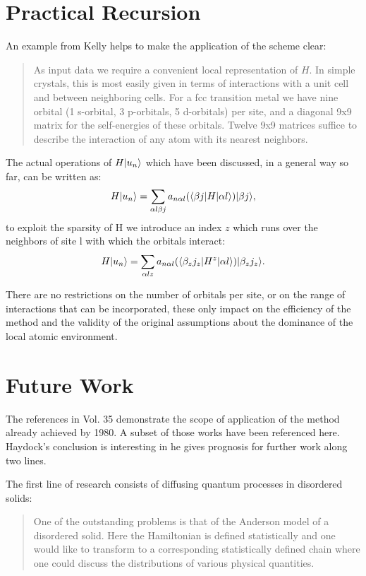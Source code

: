 \section{Practical Recursion}
An example from Kelly helps to make the application of the scheme clear:
%
\begin{quote}
As input data we require a convenient local representation of $H$. In simple crystals,
this is most easily given in terms of interactions with a unit cell and between neighboring cells.
For a fcc transition metal we have nine orbital (1 s-orbital, 3 p-orbitals, 5 d-orbitals) per site, and a diagonal 9x9 matrix
for the self-energies of these orbitals. Twelve 9x9 matrices suffice to describe the interaction 
of any atom with its nearest neighbors.
\end{quote}
%

The actual operations of $H|u_{n}\rangle$ which have been discussed, in a general way so far, 
can be written as:
%
\begin{equation}
H|u_{n}\rangle = \sum_{\alpha l \beta j}a_{n \alpha l}(\langle \beta j |H| \alpha l\rangle)|\beta j\rangle,
\end{equation}
%
to exploit the sparsity of H we introduce an index $z$ which runs over the neighbors of 
site l with which the orbitals interact:
\begin{equation}
H|u_{n}\rangle = \sum_{\alpha l z}a_{n \alpha l}(\langle \beta_{z} j_{z} |H^{z}|\alpha l\rangle)|\beta_{z} j_{z}\rangle.
\end{equation}

There are no restrictions on the number of orbitals per site, or on the range of interactions that can be
incorporated, these only impact on the efficiency of the method and the validity of the original assumptions
about the dominance of the local atomic environment.

\section{Future Work}
The references in Vol. 35 demonstrate the scope of application of the method 
already achieved by 1980. A subset of those works have been referenced here. 
Haydock's conclusion is interesting in he gives prognosis for further work
along two lines. 

The first line of research consists of diffusing quantum processes in disordered
solids:
%
\begin{quote}
One of the outstanding problems is that of the Anderson model
of a disordered solid. Here the Hamiltonian is defined statistically and
one would like to transform to a corresponding statistically defined chain where
one could discuss the distributions of various physical quantities.
\end{quote}
%

